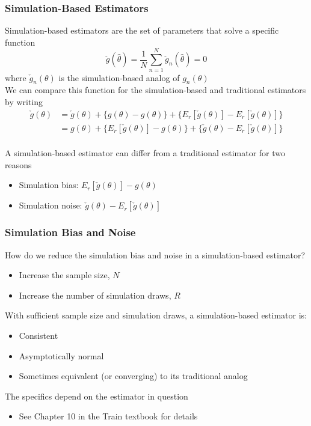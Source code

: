 \documentclass{beamer}
\begin{document}
\begin{frame}\frametitle{Simulation-Based Estimators}
     Simulation-based estimators are the set of parameters that solve a specific function
     $$\check{g}(\hat{\theta}) = \frac{1}{N} \sum_{n = 1}^N \check{g}_n(\hat{\theta}) = 0$$
     where $\check{g}_n(\theta)$ is the simulation-based analog of $g_n(\theta)$ \\
     \vspace{2ex}
     We can compare this function for the simulation-based and traditional estimators by writing
     \begin{align*}
        \check{g}(\theta) &= \check{g}(\theta) + \{ g(\theta) - g(\theta) \} + \{ E_r[\check{g}(\theta)] - E_r[\check{g}(\theta)] \} \\
        &= g(\theta) + \{ E_r[\check{g}(\theta)] - g(\theta) \} + \{ \check{g}(\theta) - E_r[\check{g}(\theta)] \}
     \end{align*} \\
     \vspace{2ex}
     A simulation-based estimator can differ from a traditional estimator for two reasons
     \begin{itemize}
         \item Simulation bias: $E_r[\check{g}(\theta)] - g(\theta)$
         \item Simulation noise: $\check{g}(\theta) - E_r[\check{g}(\theta)]$
     \end{itemize}
\end{frame}

\begin{frame}\frametitle{Simulation Bias and Noise}
    How do we reduce the simulation bias and noise in a simulation-based estimator?
    \begin{itemize}
        \item Increase the sample size, $N$
        \item Increase the number of simulation draws, $R$
    \end{itemize}
    \vspace{2ex}
    With sufficient sample size and simulation draws, a simulation-based estimator is:
    \begin{itemize}
        \item Consistent
        \item Asymptotically normal
        \item Sometimes equivalent (or converging) to its traditional analog
    \end{itemize}
    \vspace{2ex}
    The specifics depend on the estimator in question
    \begin{itemize}
        \item See Chapter 10 in the Train textbook for details
    \end{itemize}
\end{frame}
\end{document}

